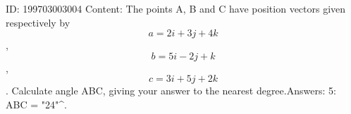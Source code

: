 \documentclass{article}
\begin{document}
ID: 199703003004
Content:
The points A, B and C have position vectors given respectively by \[a = 2i + 3j + 4k\], \[b = 5i - 2j + k\], \[c = 3i + 5j + 2k\]. Calculate angle ABC, giving your answer to the nearest degree.Answers:
5: \angle ABC = "24"^{\circ}.
\end{document}
